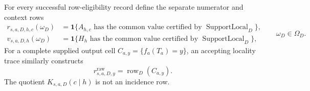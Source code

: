 For every successful row-eligibility record define the separate numerator and context rows
\[
\begin{split}
r_{s,a,D,h,c}(\omega_D)
&=\mathbf 1\{A_{h,c}\text{ has the common value certified by }
\operatorname{SupportLocal}_D\},\\
v_{s,a,D,h}(\omega_D)
&=\mathbf 1\{H_h\text{ has the common value certified by }
\operatorname{SupportLocal}_D\},
\end{split}
\qquad \omega_D\in\Omega_D.
\]
For a complete supplied output cell \(C_{a,y}=\{f_a(T_a)=y\}\), an accepting locality trace similarly constructs
\[
r^{\mathrm{raw}}_{s,a,D,y}=\operatorname{row}_D(C_{a,y}).
\]
The quotient \(K_{s,a,D}(c\mid h)\) is not an incidence row.